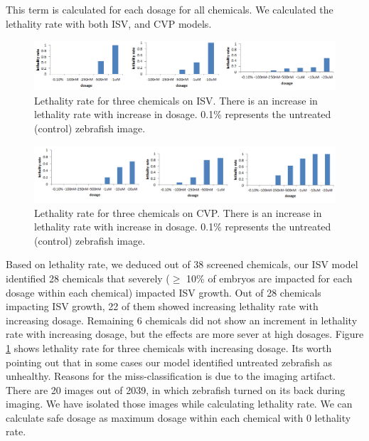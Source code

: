 This term is calculated for each dosage for all chemicals. We calculated the lethality rate with both ISV, and CVP models.


\begin{landscape}
\begin{figure}[H]\centering
  \begin{center}
    \includegraphics[scale=0.7]{figure/lethalityISV.png}
  \end{center}
  \caption[Effect of varying dosage on ISV]{Lethality rate for three chemicals on ISV. There is an increase in lethality rate with increase in dosage. 0.1\% represents the untreated (control) zebrafish image.}
  \label{lethalISV}
\end{figure}

\begin{figure}[H]\centering
  \begin{center}
    \includegraphics[scale=0.7]{figure/lethalityCVP.png}
  \end{center}
  \caption[Effect of varying dosage on CVP]{Lethality rate for three chemicals on CVP. There is an increase in lethality rate with increase in dosage. 0.1\% represents the untreated (control) zebrafish image.}
  \label{lethalcvp}
\end{figure}
\end{landscape}

Based on lethality rate, we deduced out of 38 screened chemicals, our ISV model identified 28 chemicals that severely ($\geq$ 10\% of embryos are impacted for each dosage within each chemical) impacted ISV growth. Out of 28 chemicals impacting ISV growth, 22 of them showed increasing lethality rate with increasing dosage. Remaining 6 chemicals did not show an increment in lethality rate with increasing dosage, but the effects are more sever at high dosages. Figure \ref{lethalISV} shows lethality rate for three chemicals with increasing dosage. Its worth pointing out that in some cases our model identified untreated zebrafish as unhealthy. Reasons for the miss-classification is due to the imaging artifact. There are 20 images out of 2039, in which zebrafish turned on its back during imaging. We have isolated those images while calculating lethality rate. We can calculate safe dosage as maximum dosage within each chemical with 0 lethality rate.

